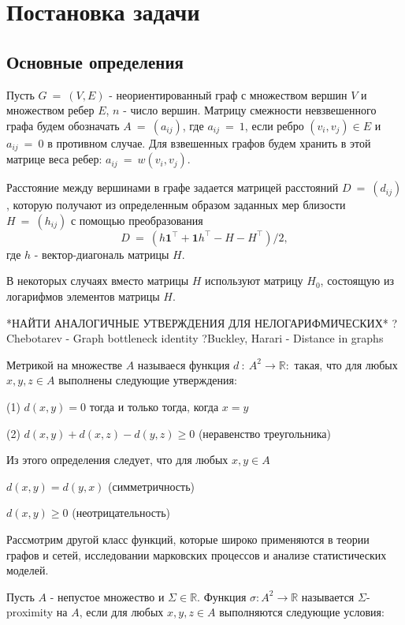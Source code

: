 \chapter{Постановка задачи} \label{chapt1}

\section{Основные определения} \label{sect1_1}

Пусть $G~=~(V, E)$ - неориентированный граф с множеством вершин $V$ и множеством ребер $E$, $n$ - число вершин. Матрицу смежности невзвешенного графа будем обозначать $A~=~(a_{ij})$, где $a_{ij}~=~1$, если ребро $(v_i, v_j) \in E$ и $a_{ij}~=~0$ в противном случае. Для взвешенных графов будем хранить в этой матрице веса ребер: $a_{ij}~=~w(v_i, v_j)$.

Расстояние между вершинами в графе задается матрицей расстояний $D~=~(d_{ij})$, которую получают из определенным образом заданных мер близости $H~=~(h_{ij})$ с помощью преобразования
$$D~=~(h \textbf{1}^\intercal + \textbf{1} h^\intercal - H - H ^\intercal) /2, $$
где $h$ - вектор-диагональ матрицы $H$.

В некоторых случаях вместо матрицы $H$ используют матрицу $H_0$, состоящую из логарифмов элементов матрицы $H$.

*НАЙТИ АНАЛОГИЧНЫЕ УТВЕРЖДЕНИЯ ДЛЯ НЕЛОГАРИФМИЧЕСКИХ*
? Chebotarev - Graph bottleneck identity
?Buckley, Harari - Distance in graphs

Метрикой на множестве $A$ называеся функция $d~:~ A^2\rightarrow \mathbb{R}:$ такая, что для любых $x,y,z \in A$ выполнены следующие утверждения:

(1) $d(x,y) = 0$ тогда и только тогда, когда $x=y$

(2) $d(x,y) + d(x,z) - d(y,z) \ge 0$ (неравенство треугольника)

Из этого определения следует, что для любых $x,y \in A$

$d(x,y) = d(y,x)$ (симметричность)

$d(x,y) \ge 0$ (неотрицательность)


Рассмотрим другой класс функций, которые широко применяются в теории графов и сетей, исследовании марковских процессов и анализе статистических моделей.

Пусть $A$ - непустое множество и $\Sigma \in \mathbb{R}$. Функция $\sigma: A^2 \rightarrow \mathbb{R}$ называется $\Sigma$-proximity на $A$, если для любых $x,y,z \in A$ выполняются следующие условия:

